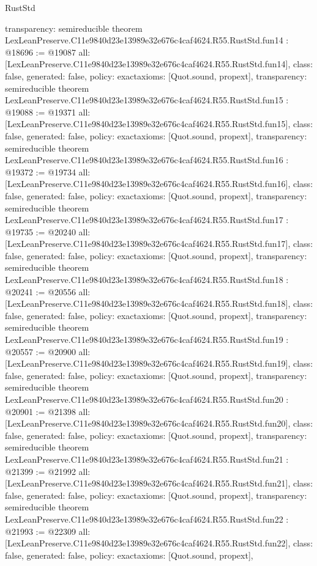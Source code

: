 \begin{lexlean}{RustStd}
\begin{coremodule}
{  transparency: semireducible
}
theorem LexLeanPreserve.C11e9840d23e13989e32e676c4caf4624.R55.RustStd.fun14 : @18696 := @19087 {
  all: [LexLeanPreserve.C11e9840d23e13989e32e676c4caf4624.R55.RustStd.fun14],
  class: false,
  generated: false,
  policy: exact{axioms: [Quot.sound, propext]},
  transparency: semireducible
}
theorem LexLeanPreserve.C11e9840d23e13989e32e676c4caf4624.R55.RustStd.fun15 : @19088 := @19371 {
  all: [LexLeanPreserve.C11e9840d23e13989e32e676c4caf4624.R55.RustStd.fun15],
  class: false,
  generated: false,
  policy: exact{axioms: [Quot.sound, propext]},
  transparency: semireducible
}
theorem LexLeanPreserve.C11e9840d23e13989e32e676c4caf4624.R55.RustStd.fun16 : @19372 := @19734 {
  all: [LexLeanPreserve.C11e9840d23e13989e32e676c4caf4624.R55.RustStd.fun16],
  class: false,
  generated: false,
  policy: exact{axioms: [Quot.sound, propext]},
  transparency: semireducible
}
theorem LexLeanPreserve.C11e9840d23e13989e32e676c4caf4624.R55.RustStd.fun17 : @19735 := @20240 {
  all: [LexLeanPreserve.C11e9840d23e13989e32e676c4caf4624.R55.RustStd.fun17],
  class: false,
  generated: false,
  policy: exact{axioms: [Quot.sound, propext]},
  transparency: semireducible
}
theorem LexLeanPreserve.C11e9840d23e13989e32e676c4caf4624.R55.RustStd.fun18 : @20241 := @20556 {
  all: [LexLeanPreserve.C11e9840d23e13989e32e676c4caf4624.R55.RustStd.fun18],
  class: false,
  generated: false,
  policy: exact{axioms: [Quot.sound, propext]},
  transparency: semireducible
}
theorem LexLeanPreserve.C11e9840d23e13989e32e676c4caf4624.R55.RustStd.fun19 : @20557 := @20900 {
  all: [LexLeanPreserve.C11e9840d23e13989e32e676c4caf4624.R55.RustStd.fun19],
  class: false,
  generated: false,
  policy: exact{axioms: [Quot.sound, propext]},
  transparency: semireducible
}
theorem LexLeanPreserve.C11e9840d23e13989e32e676c4caf4624.R55.RustStd.fun20 : @20901 := @21398 {
  all: [LexLeanPreserve.C11e9840d23e13989e32e676c4caf4624.R55.RustStd.fun20],
  class: false,
  generated: false,
  policy: exact{axioms: [Quot.sound, propext]},
  transparency: semireducible
}
theorem LexLeanPreserve.C11e9840d23e13989e32e676c4caf4624.R55.RustStd.fun21 : @21399 := @21992 {
  all: [LexLeanPreserve.C11e9840d23e13989e32e676c4caf4624.R55.RustStd.fun21],
  class: false,
  generated: false,
  policy: exact{axioms: [Quot.sound, propext]},
  transparency: semireducible
}
theorem LexLeanPreserve.C11e9840d23e13989e32e676c4caf4624.R55.RustStd.fun22 : @21993 := @22309 {
  all: [LexLeanPreserve.C11e9840d23e13989e32e676c4caf4624.R55.RustStd.fun22],
  class: false,
  generated: false,
  policy: exact{axioms: [Quot.sound, propext]},
}
\end{coremodule}
\end{lexlean}
